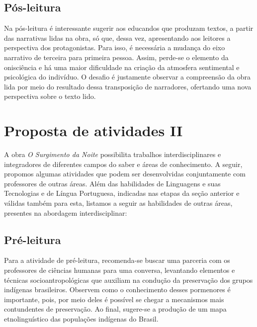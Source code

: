 \documentclass[12pt]{extarticle}
\begin{document}
\subsection{Pós-leitura}

Na pós-leitura é interessante sugerir aos educandos que
produzam textos, a partir das narrativas lidas na obra, só que, dessa
vez, apresentando aos leitores a perspectiva dos protagonistas. Para
isso, é necessária a mudança do eixo narrativo de terceira para primeira
pessoa. Assim, perde-se o elemento da onisciência e há uma maior
dificuldade na criação da atmosfera sentimental e psicológica do
indivíduo. O desafio é justamente observar a compreensão da obra lida
por meio do resultado dessa transposição de narradores, ofertando uma
nova perspectiva sobre o texto lido.


\section{Proposta de atividades II}


A obra \emph{O Surgimento da Noite} possibilita trabalhos
interdisciplinares e integradores de diferentes campos do saber e áreas
de conhecimento. A seguir, propomos algumas atividades que podem ser
desenvolvidas conjuntamente com professores de outras áreas. Além das
habilidades de Linguagens e suas Tecnologias e de Língua Portuguesa,
indicadas nas etapas da seção anterior e válidas também para esta,
listamos a seguir as habilidades de outras áreas, presentes na abordagem
interdisciplinar:



\subsection{Pré-leitura}

Para a atividade de pré-leitura, recomenda-se buscar uma
parceria com os professores de ciências humanas para uma conversa,
levantando elementos e técnicas socioantropológicas que auxiliam na
condução da preservação dos grupos indígenas brasileiros. Observem como
o conhecimento desses pormenores é importante, pois, por meio deles é
possível se chegar a mecanismos mais contundentes de preservação. Ao
final, sugere-se a produção de um mapa etnolinguístico das populações
indígenas do Brasil.
\end{document}
